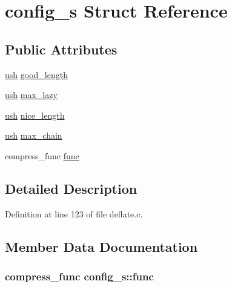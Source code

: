 \hypertarget{structconfig__s}{\section{config\-\_\-s Struct Reference}
\label{structconfig__s}
}
\subsection*{Public Attributes}
\begin{DoxyCompactItemize}
\item 
\hyperlink{zutil_8h_a3754180d606d4ed15468d15d9665aa2e}{ush} \hyperlink{structconfig__s_a36152319fbe49bebbc0354f8bcb617a6}{good\-\_\-length}
\item 
\hyperlink{zutil_8h_a3754180d606d4ed15468d15d9665aa2e}{ush} \hyperlink{structconfig__s_afecf50eeeb2afca11ab28d344280231b}{max\-\_\-lazy}
\item 
\hyperlink{zutil_8h_a3754180d606d4ed15468d15d9665aa2e}{ush} \hyperlink{structconfig__s_af2a1e023e10d6e0c9ff64f8c0c4c9894}{nice\-\_\-length}
\item 
\hyperlink{zutil_8h_a3754180d606d4ed15468d15d9665aa2e}{ush} \hyperlink{structconfig__s_ac0ef64600cf4487e3754a21934ffdb89}{max\-\_\-chain}
\item 
compress\-\_\-func \hyperlink{structconfig__s_aea5a0fe31d694079966523a49d60174b}{func}
\end{DoxyCompactItemize}


\subsection{Detailed Description}


Definition at line 123 of file deflate.\-c.



\subsection{Member Data Documentation}
\hypertarget{structconfig__s_aea5a0fe31d694079966523a49d60174b}{
\subsubsection[{func}]{\setlength{\rightskip}{0pt plus 5cm}compress\-\_\-func config\-\_\-s\-::func}}\label{structconfig__s_aea5a0fe31d694079966523a49d60174b}


